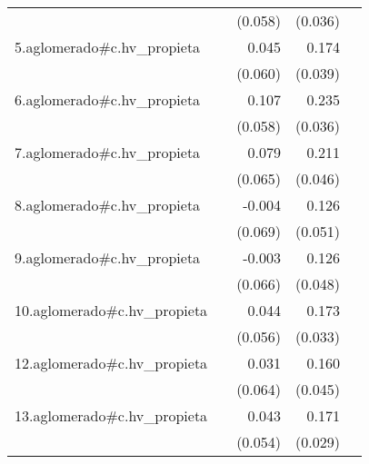 {\begin{longtable}{l*{4}{D{.}{.}{-1}}}
            &                     &     (0.058)         &     (0.036)         &                     \\
\addlinespace
5.aglomerado#c.hv\_propieta&                     &       0.045         &       0.174\sym{***}&                     \\
            &                     &     (0.060)         &     (0.039)         &                     \\
\addlinespace
6.aglomerado#c.hv\_propieta&                     &       0.107         &       0.235\sym{***}&                     \\
            &                     &     (0.058)         &     (0.036)         &                     \\
\addlinespace
7.aglomerado#c.hv\_propieta&                     &       0.079         &       0.211\sym{***}&                     \\
            &                     &     (0.065)         &     (0.046)         &                     \\
\addlinespace
8.aglomerado#c.hv\_propieta&                     &      -0.004         &       0.126\sym{*}  &                     \\
            &                     &     (0.069)         &     (0.051)         &                     \\
\addlinespace
9.aglomerado#c.hv\_propieta&                     &      -0.003         &       0.126\sym{**} &                     \\
            &                     &     (0.066)         &     (0.048)         &                     \\
\addlinespace
10.aglomerado#c.hv\_propieta&                     &       0.044         &       0.173\sym{***}&                     \\
            &                     &     (0.056)         &     (0.033)         &                     \\
\addlinespace
12.aglomerado#c.hv\_propieta&                     &       0.031         &       0.160\sym{***}&                     \\
            &                     &     (0.064)         &     (0.045)         &                     \\
\addlinespace
13.aglomerado#c.hv\_propieta&                     &       0.043         &       0.171\sym{***}&                     \\
            &                     &     (0.054)         &     (0.029)         &                     \\

\end{longtable}}
